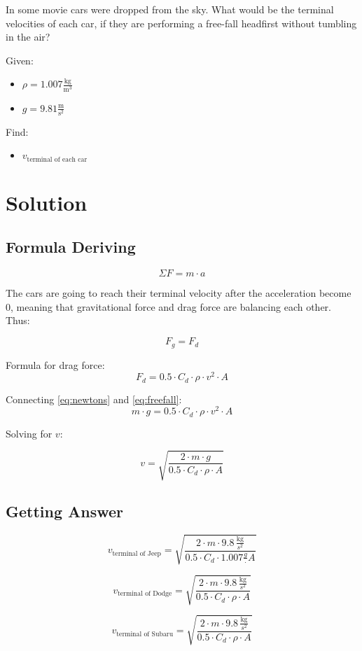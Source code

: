 
In some movie cars were dropped from the sky.
What would be the terminal velocities of each car, if they are
performing a free-fall headfirst without tumbling in the air?

\bigbreak Given:
\begin{itemize}
    \item $ \rho = 1.007 \frac{\text{kg}}{\text{m}^3} $
    \item $ g = 9.81 \frac{\text{m}}{\text{s}^2} $
\end{itemize}

Find:
\begin{itemize}
    \item $ v_{\text{terminal of each car}} $
\end{itemize}


\section*{Solution}
\subsection*{Formula Deriving}

\begin{equation}
    \label{eq:newtons}
    \Sigma F = m \cdot a
\end{equation}

The cars are going to reach their terminal velocity after the acceleration become 0,
meaning that gravitational force and drag force are balancing each other. Thus:

$$ F_g = F_d $$

Formula for drag force:
\begin{equation}
    \label{eq:freefall}
    F_d = 0.5 \cdot C_d \cdot \rho \cdot v^2 \cdot A
\end{equation}

Connecting \ref{eq:newtons} and \ref{eq:freefall}:
$$m \cdot g = 0.5 \cdot C_d \cdot \rho \cdot v^2 \cdot A $$

Solving for $v$:

\begin{equation}
    \label{eq:terminal}
    v = \sqrt{\frac{2 \cdot m \cdot g}{0.5 \cdot C_d \cdot \rho \cdot A}}
\end{equation}

\subsection*{Getting Answer}

$$ v_{\text{terminal of Jeep}} = \sqrt{\frac{2 \cdot m \cdot 9.8 \, \frac{\text{kg}}{s^2}}{0.5 \cdot C_d \cdot 1.007 \frac{g} \cdot A}} $$

$$ v_{\text{terminal of Dodge}} = \sqrt{\frac{2 \cdot m \cdot 9.8 \, \frac{\text{kg}}{s^2}}{0.5 \cdot C_d \cdot \rho \cdot A}} $$

$$ v_{\text{terminal of Subaru}} = \sqrt{\frac{2 \cdot m \cdot 9.8 \, \frac{\text{kg}}{s^2}}{0.5 \cdot C_d \cdot \rho \cdot A}} $$